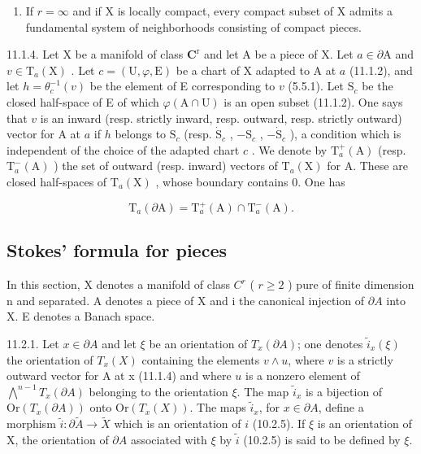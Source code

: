 \begin{enumerate}
\def\labelenumi{\alph{enumi})}
\setcounter{enumi}{3}
\tightlist
\item
  If \(r = \infty\) and if X is locally compact, every compact subset of X admits a fundamental system of neighborhoods consisting of compact pieces.
\end{enumerate}

11.1.4. Let X be a manifold of class \(\mathbf{C}^{\mathrm{r}}\) and let A be a piece of X. Let \(a \in \partial \mathrm{A}\) and \(v \in \mathrm{T}_a(\mathrm{X})\) . Let \(c = (\mathrm{U}, \varphi, \mathrm{E})\) be a chart of X adapted to A at \(a\) (11.1.2), and let \(h = \theta_c^{-1}(v)\) be the element of E corresponding to \(v\) (5.5.1). Let \(\mathrm{S}_c\) be the closed half-space of E of which \(\varphi(\mathrm{A} \cap \mathrm{U})\) is an open subset (11.1.2). One says that \(v\) is an inward (resp. strictly inward, resp. outward, resp. strictly outward) vector for A at \(a\) if \(h\) belongs to \(\mathrm{S}_c\) (resp. \(\dot{\mathrm{S}}_c\) , \(-\mathrm{S}_c\) , \(-\dot{\mathrm{S}}_c\) ), a condition which is independent of the choice of the adapted chart \(c\) . We denote by \(\mathrm{T}_a^+(\mathrm{A})\) (resp. \(\mathrm{T}_a^-(\mathrm{A})\) ) the set of outward (resp. inward) vectors of \(\mathrm{T}_a(\mathrm{X})\) for A. These are closed half-spaces of \(\mathrm{T}_a(\mathrm{X})\) , whose boundary contains 0. One has

\[
\mathrm{T} _ {a} (\partial \mathrm{A}) = \mathrm{T} _ {a} ^ {+} (\mathrm{A}) \cap \mathrm{T} _ {a} ^ {-} (\mathrm{A}).
\]

\subsection{Stokes' formula for pieces}

In this section, X denotes a manifold of class \(C^{r}\) ( \(r \geqslant 2\) ) pure of finite dimension n and separated. A denotes a piece of X and i the canonical injection of \(\partial A\) into X. E denotes a Banach space.

11.2.1. Let \(x \in \partial A\) and let \(\xi\) be an orientation of \(T_x(\partial A)\); one denotes \(\tilde{i}_x(\xi)\) the orientation of \(T_x(X)\) containing the elements \(v \wedge u\), where \(v\) is a strictly outward vector for A at x (11.1.4) and where \(u\) is a nonzero element of \(\bigwedge^{n-1} T_x(\partial A)\) belonging to the orientation \(\xi\). The map \(\tilde{i}_x\) is a bijection of \(\text{Or}(T_x(\partial A))\) onto \(\text{Or}(T_x(X))\). The maps \(\tilde{i}_x\), for \(x \in \partial A\), define a morphism \(\tilde{i} \colon \partial \widetilde{A} \to \widetilde{X}\) which is an orientation of \(i\) (10.2.5). If \(\xi\) is an orientation of X, the orientation of \(\partial A\) associated with \(\xi\) by \(\tilde{i}\) (10.2.5) is said to be defined by \(\xi\).

